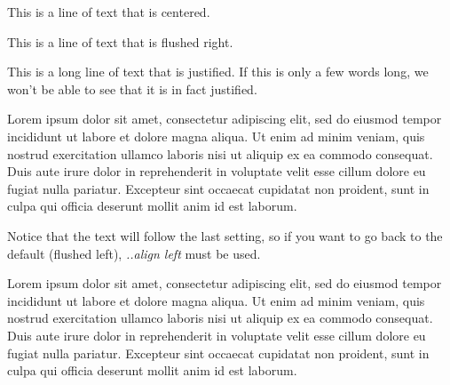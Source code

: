 \documentclass[12pt]{article}
\begin{document}
\begin{center}
This is a line of text that is centered.

\end{center}

\begin{flushright}
This is a line of text that is flushed right.

\end{flushright}
This is a long line of text that is justified. If this is only a few words long, we won't be able to see that it is in fact justified.

Lorem ipsum dolor sit amet, consectetur adipiscing elit, sed do eiusmod tempor incididunt ut labore et dolore magna aliqua. Ut enim ad minim veniam, quis nostrud exercitation ullamco laboris nisi ut aliquip ex ea commodo consequat. Duis aute irure dolor in reprehenderit in voluptate velit esse cillum dolore eu fugiat nulla pariatur. Excepteur sint occaecat cupidatat non proident, sunt in culpa qui officia deserunt mollit anim id est laborum.

\medskip

Notice that the text will follow the last setting, so if you want to go back to the default (flushed left), \emph{..align left} must be used.

\medskip


\begin{flushleft}
Lorem ipsum dolor sit amet, consectetur adipiscing elit, sed do eiusmod tempor incididunt ut labore et dolore magna aliqua. Ut enim ad minim veniam, quis nostrud exercitation ullamco laboris nisi ut aliquip ex ea commodo consequat. Duis aute irure dolor in reprehenderit in voluptate velit esse cillum dolore eu fugiat nulla pariatur. Excepteur sint occaecat cupidatat non proident, sunt in culpa qui officia deserunt mollit anim id est laborum.

\end{flushleft}
\end{document}
